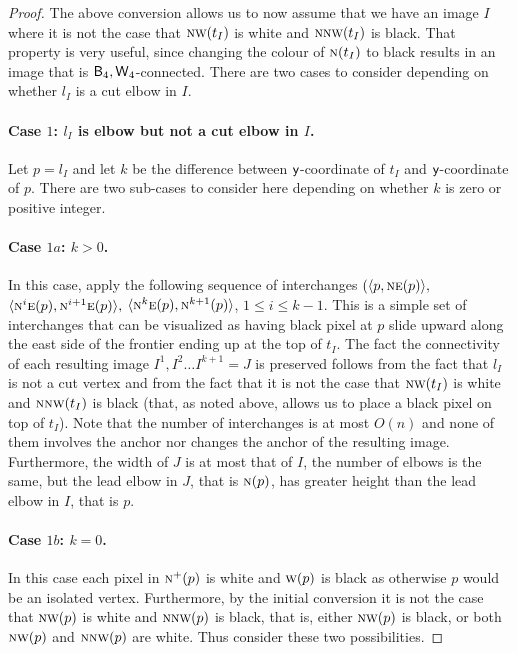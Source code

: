 \documentclass[lotsofwhite,charterfonts]{patmorin}
\newcommand{\fourfour}{\ensuremath{\protect\textup{\textsf{B}}_{4},\protect\textup{\textsf{W}}_{4}}}
\newcommand{\N}{\textsc{n}}
\newcommand{\NE}{\textsc{ne}}
\newcommand{\E}{\textsc{e}}
\newcommand{\W}{\textsc{w}}
\newcommand{\NW}{\textsc{nw}}
\newcommand{\y}{\ensuremath{\protect\textup{\textsf{y}}}}
\newcommand{\ic}[2]{\langle #1,#2 \rangle}
\begin{document}
\begin{proof}
The above conversion allows us to now assume that we have an image $I$
where it is not the case that $\NW(t_{I})$ is white and $\N\NW(t_{I})$
is black. That property is very useful, since changing the colour of
$\N(t_I)$ to black results in an image that is $\fourfour$-connected.
There are two cases to consider depending on whether $l_I$ is a cut
elbow in $I$. 

\paragraph{Case $1$: $l_I$ is elbow but not a cut elbow in $I$.} 

Let $p=l_I$ and let $k$ be the difference between \y-coordinate of
$t_I$ and \y-coordinate of $p$. There are two sub-cases to consider
here depending on whether $k$ is zero or positive integer. 

\paragraph{Case $1a$: $k>0$.} In this case, apply the following
sequence of interchanges $(\ic{p}{\NE(p)},$
$\ic{\N^i\E(p)}{\N^{i+1}\E(p)},$ $\ic{\N^k\E(p)}{\N^{k+1}(p)}$, $1
\leq i \leq k-1$. This is a simple set of interchanges that can be
visualized as having black pixel at $p$ slide upward along the east
side of the frontier ending up at the top of $t_I$. The fact the
connectivity of each resulting image $I^1, I^2\dots I^{k+1}=J$ is
preserved follows from the fact that $l_I$ is not a cut vertex and
from the fact that it is not the case that  $\NW(t_{I})$ is white and
$\N\NW(t_{I})$ is black (that, as noted above, allows us to place a
black pixel on top of $t_I$). Note that the number of interchanges is
at most $O(n)$ and none of them involves the anchor nor changes the
anchor of the resulting image. Furthermore, the width of $J$ is at
most that of $I$, the number of elbows is the same, but the lead elbow
in $J$, that is $\N(p)$, has greater height than the lead elbow in
$I$, that is $p$.   

\paragraph{Case $1b$: $k=0$.} In this case each pixel in $\N^+(p)$ is
white and $\W(p)$ is black as otherwise $p$ would be an isolated
vertex. Furthermore, by the initial conversion it is not the case that
$\NW(p)$ is white and $\N\NW(p)$ is black, that is, either $\NW(p)$ is
black, or both $\NW(p)$ and $\N\NW(p)$ are white. Thus consider these
two possibilities.


\end{proof}
\end{document}
